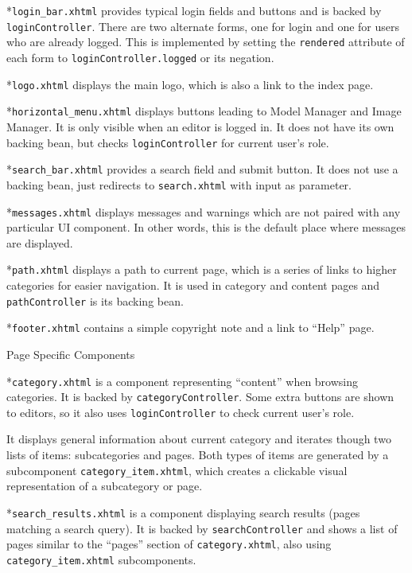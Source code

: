 *{\tt login\_bar.xhtml} provides typical login fields and buttons and is backed by {\tt loginController}. There are two alternate forms, one for login and one for users who are already logged. This is implemented by setting the {\tt rendered} attribute of each form to {\tt loginController.logged} or its negation.

*{\tt logo.xhtml} displays the main logo, which is also a link to the index page.

*{\tt horizontal\_menu.xhtml} displays buttons leading to Model Manager and Image Manager. It is only visible when an editor is logged in. It does not have its own backing bean, but checks {\tt loginController} for current user’s role.

*{\tt search\_bar.xhtml} provides a search field and submit button. It does not use a backing bean, just redirects to {\tt search.xhtml} with input as  parameter.

*{\tt messages.xhtml} displays messages and warnings which are not paired with any particular UI component. In other words, this is the default place where messages are displayed.

*{\tt path.xhtml} displays a path to current page, which is a series of links to higher categories for easier navigation. It is used in category and content pages and {\tt pathController} is its backing bean.

*{\tt footer.xhtml} contains a simple copyright note and a link to “Help” page.

\enditems

\secc Page Specific Components

\begitems

*{\tt category.xhtml} is a component representing “content” when browsing categories. It is backed by {\tt categoryController}. Some extra buttons are shown to editors, so it also uses {\tt loginController} to check current user’s role.

It displays general information about current category and iterates though two lists of items: subcategories and pages. Both types of items are generated by a subcomponent {\tt category\_item.xhtml}, which creates a clickable visual representation of a subcategory or page.

*{\tt search\_results.xhtml} is a component displaying search results (pages matching a search query). It is backed by {\tt searchController} and shows a list of pages similar to the “pages” section of {\tt category.xhtml}, also using {\tt category\_item.xhtml} subcomponents.

